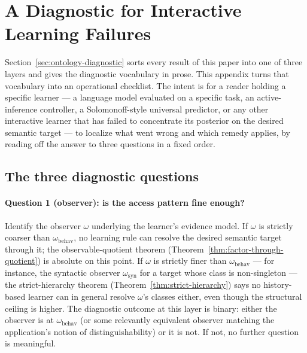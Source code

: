 %

\appendix

\section{A Diagnostic for Interactive Learning Failures}
\label{app:diagnostic}

Section~\ref{sec:ontology-diagnostic} sorts every result of this paper into one of three layers and gives the diagnostic vocabulary in prose. This appendix turns that vocabulary into an operational checklist. The intent is for a reader holding a specific learner --- a language model evaluated on a specific task, an active-inference controller, a Solomonoff-style universal predictor, or any other interactive learner that has failed to concentrate its posterior on the desired semantic target --- to localize what went wrong and which remedy applies, by reading off the answer to three questions in a fixed order.

\subsection{The three diagnostic questions}
\label{app:diagnostic-questions}

\paragraph{Question 1 (observer): is the access pattern fine enough?}
Identify the observer $\omega$ underlying the learner's evidence model. If $\omega$ is strictly coarser than $\omega_{\mathrm{behav}}$, no learning rule can resolve the desired semantic target through it; the observable-quotient theorem (Theorem~\ref{thm:factor-through-quotient}) is absolute on this point. If $\omega$ is strictly finer than $\omega_{\mathrm{behav}}$ --- for instance, the syntactic observer $\omega_{\mathrm{syn}}$ for a target whose class is non-singleton --- the strict-hierarchy theorem (Theorem~\ref{thm:strict-hierarchy}) says no history-based learner can in general resolve $\omega$'s classes either, even though the structural ceiling is higher. The diagnostic outcome at this layer is binary: either the observer is at $\omega_{\mathrm{behav}}$ (or some relevantly equivalent observer matching the application's notion of distinguishability) or it is not. If not, no further question is meaningful.

